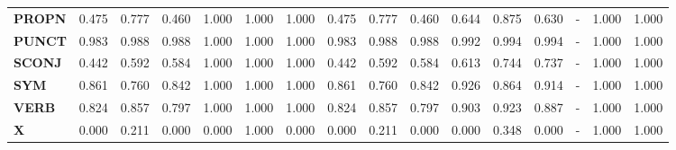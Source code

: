 \begin{table}
\begin{tabular}{|l||l||l||l||l||l||l||l||l||l||l||l||l||l||l||l|}
\textbf{PROPN} & 0.475 & 0.777 & 0.460 & 1.000 & 1.000 & 1.000 & 0.475 & 0.777 & 0.460 & 0.644 & 0.875 & 0.630 & - & 1.000 & 1.000 \\
\textbf{PUNCT} & 0.983 & 0.988 & 0.988 & 1.000 & 1.000 & 1.000 & 0.983 & 0.988 & 0.988 & 0.992 & 0.994 & 0.994 & - & 1.000 & 1.000 \\
\textbf{SCONJ} & 0.442 & 0.592 & 0.584 & 1.000 & 1.000 & 1.000 & 0.442 & 0.592 & 0.584 & 0.613 & 0.744 & 0.737 & - & 1.000 & 1.000 \\
\textbf{SYM} & 0.861 & 0.760 & 0.842 & 1.000 & 1.000 & 1.000 & 0.861 & 0.760 & 0.842 & 0.926 & 0.864 & 0.914 & - & 1.000 & 1.000 \\
\textbf{VERB} & 0.824 & 0.857 & 0.797 & 1.000 & 1.000 & 1.000 & 0.824 & 0.857 & 0.797 & 0.903 & 0.923 & 0.887 & - & 1.000 & 1.000 \\
\textbf{X} & 0.000 & 0.211 & 0.000 & 0.000 & 1.000 & 0.000 & 0.000 & 0.211 & 0.000 & 0.000 & 0.348 & 0.000 & - & 1.000 & 1.000 \\
\bottomrule
\end{tabular}
\end{table}
